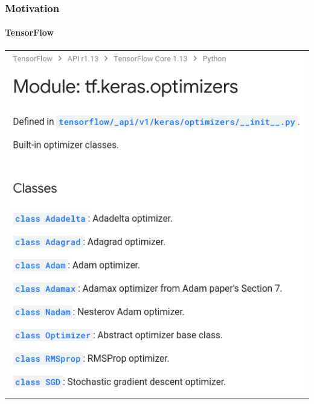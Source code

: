 \documentclass{beamer}
\begin{document}
\begin{frame}
\begin{table}[]
\begin{tabular}{c|c}
\\
        \end{tabular}
        \label{tab:logos-motivation}
    \end{table}
    
\end{frame}
  
\begin{frame}
    \frametitle{Motivation}
    \framesubtitle{TensorFlow}
    
    \begin{table}
        \centering
        \begin{tabular}{c}
        \includegraphics[scale=0.3]{tf-keras-optimizers.png}
 \\
        \end{tabular}
        \label{tab:tf-motivation}
    \end{table}
    
\end{frame}
\end{document}
